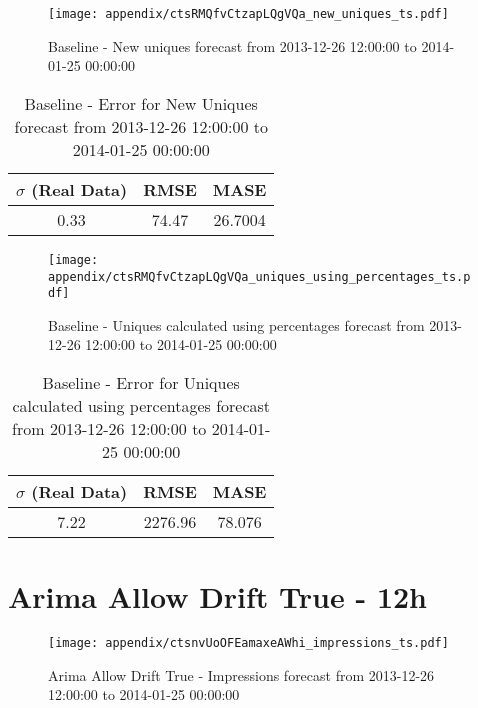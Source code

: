 \begin{figure}[H] \begin{center} \leavevmode
\texttt{[image: appendix/ctsRMQfvCtzapLQgVQa\_new\_uniques\_ts.pdf]} \caption[]{
Baseline - New uniques forecast from 2013-12-26 12:00:00 to 2014-01-25 00:00:00} \label{fig:appendix/ctsRMQfvCtzapLQgVQa_new_uniques_ts.pdf} \end{center}
\end{figure}

\begin{table}[H]
\centering
\footnotesize
\begin{tabular}{ccc}
$\sigma$ (Real Data) & RMSE & MASE   \\ \hline
0.33 & 74.47 & 26.7004 \\
\end{tabular}

\vspace{0.5cm}

\caption[]{
Baseline - Error for New Uniques forecast from 2013-12-26 12:00:00 to 2014-01-25 00:00:00}
\end{table}

\begin{figure}[H] \begin{center} \leavevmode
\texttt{[image: appendix/ctsRMQfvCtzapLQgVQa\_uniques\_using\_percentages\_ts.pdf]} \caption[]{
Baseline - Uniques calculated using percentages forecast from 2013-12-26 12:00:00 to 2014-01-25 00:00:00} \label{fig:appendix/ctsRMQfvCtzapLQgVQa_uniques_using_percentages_ts.pdf} \end{center}
\end{figure}

\begin{table}[H]
\centering
\footnotesize
\begin{tabular}{ccc}
$\sigma$ (Real Data) & RMSE & MASE   \\ \hline
7.22 & 2276.96 & 78.076 \\
\end{tabular}

\vspace{0.5cm}

\caption[]{
Baseline - Error for Uniques calculated using percentages forecast from 2013-12-26 12:00:00 to 2014-01-25 00:00:00}
\end{table}

\section{Arima Allow Drift True - 12h}
\begin{figure}[H] \begin{center} \leavevmode
\texttt{[image: appendix/ctsnvUoOFEamaxeAWhi\_impressions\_ts.pdf]} \caption[]{
Arima Allow Drift True - Impressions forecast from 2013-12-26 12:00:00 to 2014-01-25 00:00:00} \label{fig:appendix/ctsnvUoOFEamaxeAWhi_impressions_ts.pdf} \end{center}
\end{figure}

